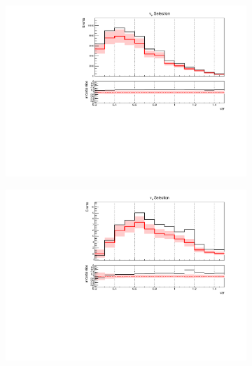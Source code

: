 \documentclass[a4paper]{article}
\begin{document}
\begin{figure}[H]
    \centering
         \begin{subfigure}[b]{0.45\textwidth}
        \centering
        \includegraphics[width=\textwidth]{ConstraintClosureTests/2sigma_up/nuenumu_reco_e_H0_dataconstraint_All_GenieAll_Genie_numu_before_data_constraint.pdf}
        \end{subfigure}  
         \begin{subfigure}[b]{0.45\textwidth}
        \centering
        \includegraphics[width=\textwidth]{ConstraintClosureTests/2sigma_up/nuenumu_reco_e_H0_dataconstraint_All_GenieAll_Genie_nue_before_data_constraint.pdf}
        \end{subfigure}
         \begin{subfigure}[b]{0.45\textwidth}
        \centering

\end{subfigure}
\end{figure}
\end{document}
